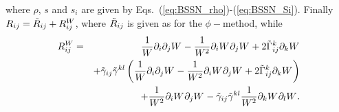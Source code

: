 \documentclass[useAMS,usenatbib]{iopart}
\begin{document}
where $\rho$, $s$ and $s_i$ are given by Eqs.~(\ref{eq:BSSN_rho})-(\ref{eq:BSSN_Si}).
Finally $R_{ij} = \tlR_{ij} + R^{W}_{ij}$, where $\tlR_{ij}$ is given as for the 
$\phi-$method, while
\begin{eqnarray}
 R^{W}_{ij} & = & \frac{1}{W}\pdpdu{W}{}{i}{j}-\frac{1}{W^2}\pdu{W}{}{i}\pdu{W}{}{j}
             +2\tlG^{k}_{ij}\pdu{W}{}{k} \nonumber \\
       &   & +\tlg_{ij}\tlg^{kl}\left (\frac{1}{W}\pdpdu{W}{}{i}{j}
             -\frac{1}{W^2}\pdu{W}{}{i}\pdu{W}{}{j}
             +2\tlG^{k}_{ij}\pdu{W}{}{k} \right ) \nonumber \\
       &   & +\frac{1}{W^2}\pdu{W}{}{i}\pdu{W}{}{j}
             -\tlg_{ij}\tlg^{kl}\frac{1}{W^2}\pdu{W}{}{k}\pdu{W}{}{l}.
\end{eqnarray} 
 




\label{lastpage}
\end{document}
